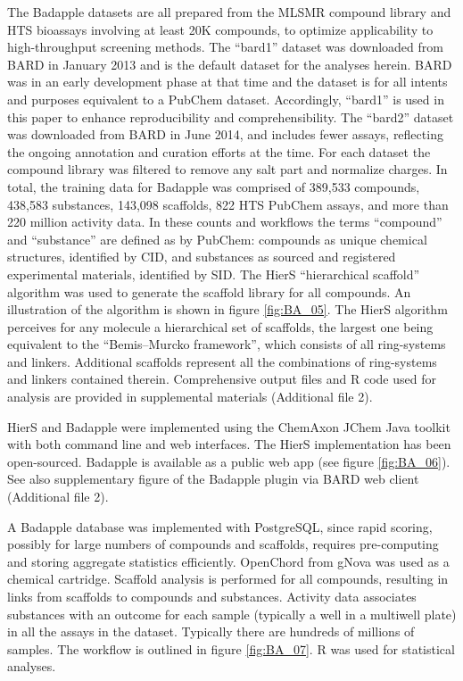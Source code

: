 The Badapple datasets are all prepared from the MLSMR compound library and HTS bioassays involving at least 20K compounds, to optimize applicability to high-throughput screening methods. The “bard1” dataset was downloaded from BARD in January 2013 and is the default dataset for the analyses herein. BARD was in an early development phase at that time and the dataset is for all intents and purposes equivalent to a PubChem dataset. Accordingly, “bard1” is used in this paper to enhance reproducibility and comprehensibility. The “bard2” dataset was downloaded from BARD in June 2014, and includes fewer assays, reflecting the ongoing annotation and curation efforts at the time. For each dataset the compound library was filtered to remove any salt part and normalize charges. In total, the training data for Badapple was comprised of 389,533 compounds, 438,583 substances, 143,098 scaffolds, 822 HTS PubChem assays, and more than 220 million activity data. In these counts and workflows the terms “compound” and “substance” are defined as by PubChem: compounds as unique chemical structures, identified by CID, and substances as sourced and registered experimental materials, identified by SID. The HierS “hierarchical scaffold” algorithm was used to generate the scaffold library for all compounds. An illustration of the algorithm is shown in figure \ref{fig:BA_05}. The HierS algorithm perceives for any molecule a hierarchical set of scaffolds, the largest one being equivalent to the “Bemis–Murcko framework”\cite{Bemis1996-jg}, which consists of all ring-systems and linkers. Additional scaffolds represent all the combinations of ring-systems and linkers contained therein. Comprehensive output files and R code used for analysis are provided in supplemental materials (Additional file 2).

HierS and Badapple were implemented using the ChemAxon JChem Java toolkit\cite{ChemAxon2012-py} with both command line and web interfaces. The HierS implementation has been open-sourced\cite{Yang2012-qd}. Badapple is available as a public web app (see figure \ref{fig:BA_06}). See also supplementary figure of the Badapple plugin via BARD web client (Additional file 2).

A Badapple database was implemented with PostgreSQL, since rapid scoring, possibly for large numbers of compounds and scaffolds, requires pre-computing and storing aggregate statistics efficiently. OpenChord from gNova was used as a chemical cartridge. Scaffold analysis is performed for all compounds, resulting in links from scaffolds to compounds and substances. Activity data associates substances with an outcome for each sample (typically a well in a multiwell plate) in all the assays in the dataset. Typically there are hundreds of millions of samples. The workflow is outlined in figure \ref{fig:BA_07}. R was used for statistical analyses.

